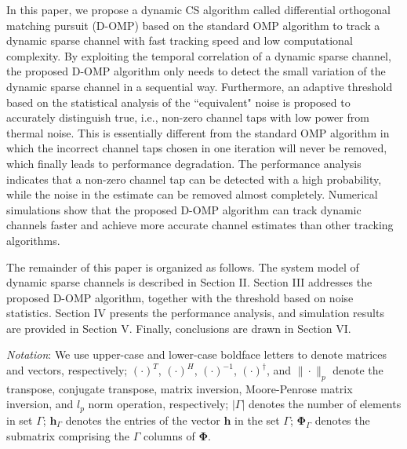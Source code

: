 \documentclass[conference]{IEEEtran}
\begin{document}
In this paper, we propose a dynamic CS algorithm called differential orthogonal matching pursuit (D-OMP) based on the standard OMP algorithm to track a dynamic sparse channel with fast tracking speed and low computational complexity.
By exploiting the temporal correlation of a dynamic sparse channel, the proposed D-OMP algorithm only needs to detect the small variation of the dynamic sparse channel in a sequential way.
Furthermore, an adaptive threshold based on the statistical analysis of the ``equivalent" noise is proposed to accurately distinguish true, i.e., non-zero channel taps with low power from thermal noise.
This is essentially different from the standard OMP algorithm in which the incorrect channel taps chosen in one iteration will never be removed, which finally leads to performance degradation.
The performance analysis indicates that a non-zero channel tap can be detected with a high probability, while the noise in the estimate can be removed almost completely. Numerical simulations show that the proposed D-OMP algorithm can track dynamic channels faster and achieve more accurate channel estimates than other tracking algorithms.

The remainder of this paper is organized as follows. The system model of dynamic sparse channels is described in Section II. Section III addresses the proposed D-OMP algorithm, together with the threshold based on noise statistics. Section IV presents the performance analysis, and simulation results are provided in Section V. Finally, conclusions are drawn in Section VI.

\emph{Notation}:
We use upper-case and lower-case boldface letters to denote matrices and vectors, respectively;
$(\cdot)^T$, $(\cdot)^H$, $(\cdot)^{-1}$, $(\cdot)^{\dagger}$, and $\|\cdot\|_p$ denote the transpose, conjugate transpose, matrix inversion, Moore-Penrose matrix inversion, and $l_p$ norm operation, respectively;
$|\Gamma|$ denotes the number of elements in set $\Gamma$;
$\mathbf{h}_{\Gamma}$ denotes the entries of the vector $\mathbf{h}$ in the set $\Gamma$;
$\mathbf{\Phi}_{\Gamma}$ denotes the submatrix comprising the $\Gamma$ columns of $\mathbf{\Phi}$.
\end{document}
